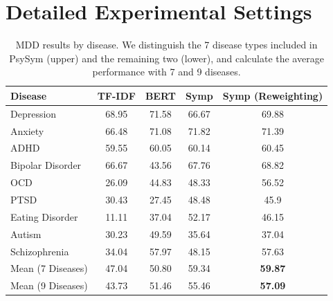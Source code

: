 \section{Detailed Experimental Settings}
\label{apd:settings}

\begin{table}[t]
    \centering
    \begin{tabular}{lcccc}
    \hline
    Disease           & TF-IDF & BERT  & Symp  & Symp (Reweighting) \\ \hline
    Depression        & 68.95  & 71.58 & 66.67 & 69.88              \\
    Anxiety           & 66.48  & 71.08 & 71.82 & 71.39              \\
    ADHD              & 59.55  & 60.05 & 60.14 & 60.45              \\
    Bipolar Disorder  & 66.67  & 43.56 & 67.76 & 68.82              \\
    OCD               & 26.09  & 44.83 & 48.33 & 56.52              \\
    PTSD              & 30.43  & 27.45 & 48.48 & 45.9               \\
    Eating Disorder   & 11.11  & 37.04 & 52.17 & 46.15              \\ \hline
    Autism            & 30.23  & 49.59 & 35.64 & 37.04              \\
    Schizophrenia     & 34.04  & 57.97 & 48.15 & 57.63              \\ \hline
    Mean (7 Diseases) & 47.04  & 50.80 & 59.34 & \textbf{59.87}     \\
    Mean (9 Diseases) & 43.73  & 51.46 & 55.46 & \textbf{57.09}     \\ \hline
    \end{tabular}
    \caption{MDD results by disease. We distinguish the 7 disease types included in PsySym (upper) and the remaining two (lower), and calculate the average performance with 7 and 9 diseases.}
    \label{tab:mdd_by_disease}
\end{table}

